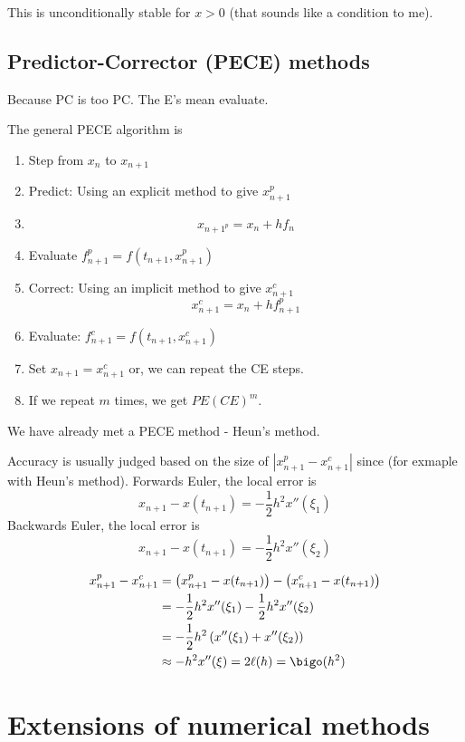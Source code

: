 \documentclass{X:/Documents/Coding/Latex/myassignment}
\begin{document}
This is unconditionally stable for $x >0$ (that sounds like a condition to me).



\subsection{Predictor-Corrector (PECE) methods}
Because PC is too PC. The E's mean evaluate.

The general PECE algorithm is 
\begin{enumerate}
    \item Step from $x_n$ to $x_{n+1}$
    \item Predict: Using an explicit method to give $x_{n+1}^p$ 
    \item \[x_{n+1^p} = x_n + h f_n\]
    \item Evaluate $f_{n+1}^p = f(t_{n+1},x_{n+1}^p)$
    \item Correct: Using an implicit method to give $x_{n+1}^c$
    \[x_{n+1}^c = x_n + hf_{n+1}^p\]
    \item Evaluate: $f_{n+1}^c = f(t_{n+1},x_{n+1}^c)$
    \item Set $x_{n+1} = x_{n+1}^c$ or, we can repeat the CE steps.
    \item If we repeat $m$ times, we get $PE(CE)^m$.
\end{enumerate}

We have already met a PECE method - Heun's method.

Accuracy is usually judged based on the size of $|x_{n+1}^p - x_{n+1}^c|$ since (for exmaple with Heun's method).
Forwards Euler, the local error is 
\[x_{n+1} - x(t_{n+1}) = -\frac12 h^2 x''(\xi_1)\]
Backwards Euler, the local error is
\[x_{n+1} - x(t_{n+1}) = -\frac12 h^2 x''(\xi_2)\] 

\begin{align*}
    x_{n+1}^p - x_{n+1}^c &= \left(x_{n+1}^p - x(t_{n+1})\right) - \left(x_{n+1}^c - x(t_{n+1})\right)\\
    &= -\frac12h^2 x''(\xi_1) - \frac12 h^2 x''(\xi_2)\\
    &= -\frac12 h^2 \left(x''(\xi_1) + x''(\xi_2)\right)\\
    &\approx -h^2 x''(\xi) =2\ell(h) = \bigo(h^2)
\end{align*}

\section{Extensions of numerical methods}
\end{document}
